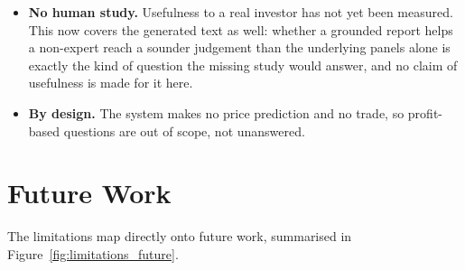 \begin{itemize}
        The adversarial exercise that produced the current guard was also \emph{incomplete}, and the
        manner of its incompleteness is worth recording. Six attack perspectives were commissioned;
        two completed, producing $114$ attempts of which $21$ were reproduced, and the remainder
        terminated on an account spending limit --- including every independent verification stage.
        The exercise therefore returned a nominally clean verdict that was in fact the \emph{absence}
        of verification, a failure mode this project has now encountered repeatedly. The findings
        acted upon were confirmed by hand against the running code, and the corpus retains them as
        regressions; but the guard has not faced four of the six perspectives, and the honest
        statement is that its measured strength is a lower bound established against an interrupted
        adversary.
  \item \textbf{No human study.} Usefulness to a real investor has not yet been measured. This now
        covers the generated text as well: whether a grounded report helps a non-expert reach a
        sounder judgement than the underlying panels alone is exactly the kind of question the
        missing study would answer, and no claim of usefulness is made for it here.
  \item \textbf{By design.} The system makes no price prediction and no trade, so profit-based questions
        are out of scope, not unanswered.
\end{itemize}

\section{Future Work}
\label{sec:concl_future}

The limitations map directly onto future work, summarised in Figure~\ref{fig:limitations_future}.

